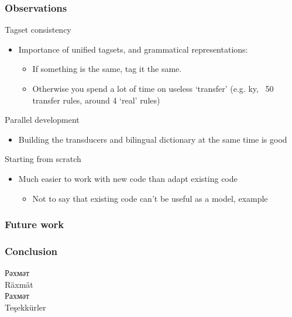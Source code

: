 \documentclass[10pt,xetex]{beamer} %
\begin{document}
\begin{frame}
  \frametitle{Observations}

\begin{block}{Tagset consistency}
  \begin{itemize}
    \item Importance of unified tagsets, and grammatical representations:
    \begin{itemize}
      \item If something is the same, tag it the same.
      \item Otherwise you spend a lot of time on useless `transfer'
        (e.g. ky, ~50 transfer rules, around 4 `real' rules)
    \end{itemize}
  \end{itemize}
\end{block}

\begin{block}{Parallel development}
  \begin{itemize}
    \item Building the transducers and bilingual dictionary at the same time is good
  \end{itemize}
\end{block}

\begin{block}{Starting from scratch}
  \begin{itemize}
    \item Much easier to work with new code than adapt existing code
    \begin{itemize}
      \item Not to say that existing code can't be useful as a model, example
    \end{itemize}
  \end{itemize}
\end{block}

\end{frame}


\begin{frame}
  \frametitle{Future work}

\end{frame}

\begin{frame}
  \frametitle{Conclusion}

\begin{block}


\end{block}

\end{frame}

\begin{frame}

\begin{Large}
\begin{center}
Рәхмәт \\ 
Räxmät \\
Рахмәт \\ 
Teşekkürler\\
~\\
\smiley
\end{center}
\end{Large}
\end{frame}
\end{document}
